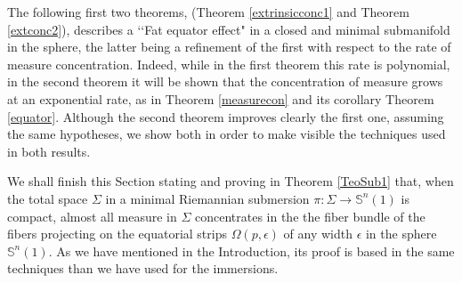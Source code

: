 \documentclass{amsart}
\theoremstyle{definition}
\theoremstyle{remark}
\newcommand{\ese}{\mathbb{S}}
\begin{document}
The following first two  theorems, (Theorem \ref{extrinsicconc1} and Theorem \ref{extconc2}), describes a \lq\lq Fat equator effect" in a closed and minimal submanifold in the sphere, the latter being a refinement of the first with respect to the rate of measure concentration. Indeed, while in the first theorem this rate is polynomial, in the second theorem it will be shown that the concentration of measure grows at an exponential rate, as in Theorem \ref{measurecon} and its corollary  Theorem \ref{equator}. Although the second theorem improves clearly the first one, assuming the same hypotheses, we show both in order to make visible the techniques used in both results.

We shall finish this Section stating and proving in Theorem \ref{TeoSub1}  that, when the total space $\Sigma$ in a minimal Riemannian submersion $\pi: \Sigma \rightarrow \ese^n(1)$ is compact, almost all measure in $\Sigma$ concentrates in the the fiber bundle of the fibers projecting on the equatorial strips $\Omega(p, \epsilon)$ of any width $\epsilon$ in the sphere $\ese^n(1)$. As we have mentioned in the Introduction, its proof is based in the same techniques than we have used for the immersions.
\end{document}

